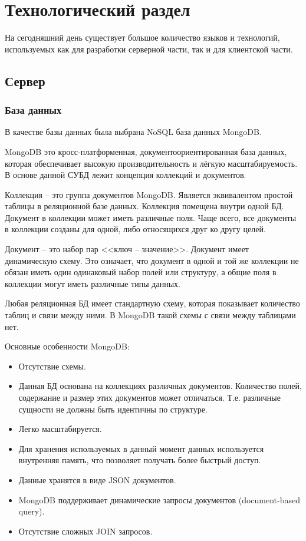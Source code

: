 \chapter{Технологический раздел}
На сегодняшний день существует большое количество языков и технологий, используемых как для разработки серверной части, так и для клиентской части.
\section{Сервер}

\subsection{База данных}
В качестве базы данных была выбрана NoSQL база данных MongoDB.

MongoDB это кросс-платформенная, документоориентированная база данных, которая обеспечивает высокую производительность и лёгкую масштабируемость. В основе данной СУБД лежит концепция коллекций и документов.

Коллекция – это группа документов MongoDB. Является эквивалентом простой таблицы в реляционной базе данных. Коллекция помещена внутри одной БД. Документ в коллекции может иметь различные поля. Чаще всего, все документы в коллекции созданы для одной, либо относящихся друг ко другу целей.

Документ – это набор пар <<ключ – значение>>. Документ имеет динамическую схему. Это означает, что документ в одной и той же коллекции не обязан иметь один одинаковый набор полей или структуру, а общие поля в коллекции могут иметь различные типы данных.

Любая реляционная БД имеет стандартную схему, которая показывает количество таблиц и связи между ними. В MongoDB такой схемы с связи между таблицами нет.

Основные особенности MongoDB:

\begin{itemize}
	\item Отсутствие схемы.
	\item Данная БД основана на коллекциях различных документов. Количество полей, содержание и размер этих документов может отличаться. Т.е. различные сущности не должны быть идентичны по структуре.
	\item Легко масштабируется.
	\item Для хранения используемых в данный момент данных используется внутренняя память, что позволяет получать более быстрый доступ.
	\item Данные хранятся в виде JSON документов.
	\item MongoDB поддерживает динамические запросы документов (document-based query).
	\item Отсутствие сложных JOIN запросов.
\end{itemize}

